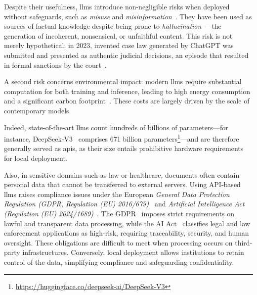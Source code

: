 Despite their usefulness, \acp{llm} introduce non-negligible risks when deployed without safeguards, such as \emph{misuse} and \emph{misinformation}~\cite{bender2021stochastic,weidinger2022taxonomy}. They have been used as sources of factual knowledge despite being prone to \emph{hallucination}~\cite{maynez-etal-2020-faithfulness-hallucination,ji_etal-2023-survey-hallucination}---\ie the generation of incoherent, nonsensical, or unfaithful content. This risk is not merely hypothetical: in 2023, invented case law generated by ChatGPT was submitted and presented as authentic judicial decisions, an episode that resulted in formal sanctions by the court~\cite{milmo2023two_us_lawyers_fined_chatgpt}.

A second risk concerns environmental impact: modern \acp{llm} require substantial computation for both training and inference, leading to high energy consumption and a significant carbon footprint~\cite{strubell2019energy,patterson2022carbon}. These costs are largely driven by the scale of contemporary models.

Indeed, state-of-the-art \acp{llm} count hundreds of billions of parameters---for instance, DeepSeek-V3~\cite{deepseekai2025deepseekv3technicalreport} comprises 671 billion parameters\footnote{\url{https://huggingface.co/deepseek-ai/DeepSeek-V3}}---and
 are therefore generally served as \acp{api}, as their size entails prohibitive hardware requirements for local deployment.



Also, in sensitive domains such as law or healthcare, documents often contain personal data that cannot be transferred to external servers. Using API-based \acp{llm} raises compliance issues under the European \emph{General Data Protection Regulation (GDPR, Regulation (EU) 2016/679)}~\cite{gdpr2016} and \emph{Artificial Intelligence Act (Regulation (EU) 2024/1689)}~\cite{ai_act}. The GDPR~\cite{gdpr2016} imposes strict requirements on lawful and transparent data processing, while the AI Act~\cite{ai_act} classifies legal and law enforcement applications as high-risk, requiring traceability, security, and human oversight. These obligations are difficult to meet when processing occurs on third-party infrastructures. Conversely, local deployment allows institutions to retain control of the data, simplifying compliance and safeguarding confidentiality.

